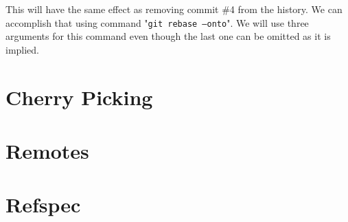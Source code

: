 \documentclass{article}
\theoremstyle{definition}
\begin{document}
        \noindent This will have the same effect as removing commit \#4 from the history. We can accomplish that using
        command "\texttt{git rebase --onto}". We will use three arguments for this command even though the last one
        can be omitted as it is implied.

        \section{Cherry Picking}
        \section{Remotes}
        \section{Refspec}
\end{document}
